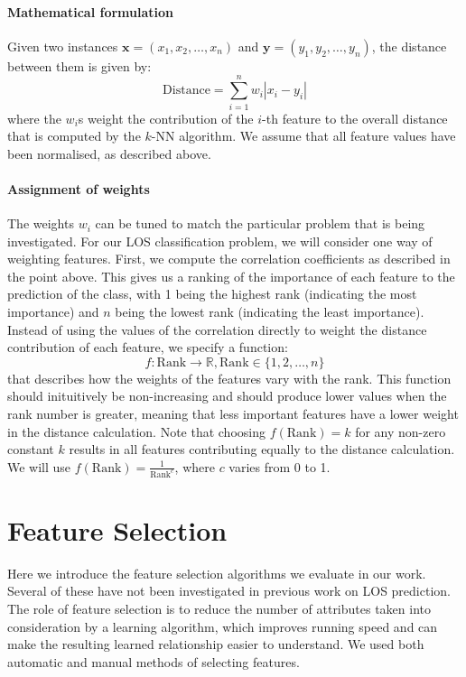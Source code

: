 \documentclass{article}
\begin{document}
\paragraph{Mathematical formulation}
Given two instances $\mathbf{x} = (x_1,x_2,\ldots,x_n)$ and
$\mathbf{y} = (y_1,y_2,\ldots,y_n)$, the distance between them is given by:
\begin{equation*}
\mathrm{Distance} = \sum_{i=1}^n w_i |x_i-y_i|
\end{equation*}
where the $w_i$s weight the contribution of the $i$-th feature to the overall
distance that is computed by the $k$-NN algorithm. We assume that all feature
values have been normalised, as described above.

\paragraph{Assignment of weights}
The weights $w_i$ can be tuned to match the particular problem that is being
investigated. For our LOS classification problem, we will consider one way
of weighting features.
First, we compute the correlation coefficients as described in the point above.
This gives us a ranking of the importance of each feature to the prediction of
the class, with 1 being the highest rank (indicating the most importance) and
$n$ being the lowest rank (indicating the least importance).
Instead of using the values of the correlation directly to weight
the distance contribution of each feature, we specify a function:
\begin{equation*}
f : \mathrm{Rank} \rightarrow \mathbb{R}, \mathrm{Rank} \in \{1,2,\ldots,n\}
\end{equation*}
that describes
how the weights of the features vary with the rank. This function should
inituitively be non-increasing and should produce lower values when the rank
number is greater, meaning that less important features have a lower weight
in the distance calculation.
Note that choosing $f(\mathrm{Rank}) = k$ for any non-zero constant $k$
results in all features contributing equally to the distance calculation.
We will use $f(\mathrm{Rank}) = \frac{1}{\mathrm{Rank}^c}$, where
$c$ varies from 0 to 1.

\section{Feature Selection}
\label{sec:features}
Here we introduce the feature selection algorithms we evaluate in our work.
Several of these have not been investigated in previous work on LOS prediction.
The role of feature selection is to reduce the number of attributes taken into
consideration by a learning algorithm, which improves running speed and can
make the resulting learned relationship easier to understand. We used both
automatic and manual methods of selecting features.
\end{document}
